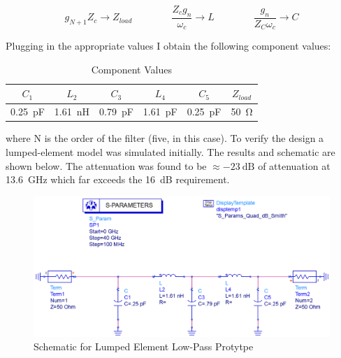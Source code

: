 \begin{equation}
g_{N+1} Z_c \rightarrow Z_{load} \quad \quad \quad \quad
    \frac{Z_c g_n}{\omega_c} \rightarrow L \quad \quad \quad \quad
\frac{g_n}{Z_C \omega_c } \rightarrow C \nonumber
    \end{equation}

    Plugging in the appropriate values I obtain the following component values:

    \begin{table}[H]
        \centering
        \caption{Component Values}
        \label{tab:1a_comp_values}
        \begin{tabular}{|c|c|c|c|c|c|}
            \hline $C_1$ & $L_2$  & $C_3$ & $L_4$ & $C_5$ & $
            Z_{load}$ \\ 
            \hline \SI{.25}{\pico\farad}  & \SI{1.61}{\nano\henry} &
            \SI{.79}{\pico\farad}  & \SI{1.61}{\pico\farad}  &
            \SI{.25}{\pico\farad} &
            \SI{50}{\ohm}  \\
            \hline
        \end{tabular}
    \end{table}

    where N is the order of the filter (five, in this case).
    To verify the design a lumped-element model was simulated initially. The
    results and schematic are shown below. The
    attenuation was found to be $\approx \SI{-23}{\deci\bel}$ of attenuation at
    \SI{13.6}{\giga\hertz} which far exceeds the \SI{16}{\deci\bel} requirement.

    \begin{figure}[H]
        \centering
        \includegraphics[width=0.8\linewidth]{img/Problem1/LumpedElementSchematic.PNG}
        \caption{Schematic for Lumped Element Low-Pass Protytpe}
        \label{fig:1a:LumpedElementSchematic}
    \end{figure}

